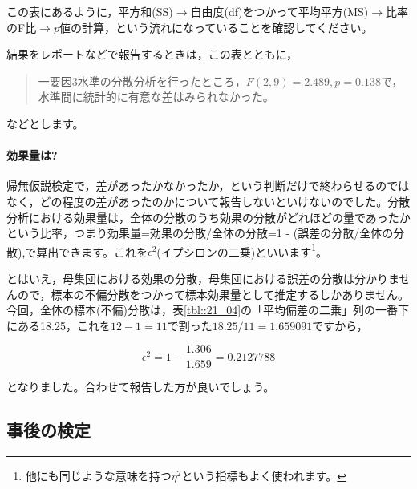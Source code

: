 \documentclass{ltjbook}
\begin{document}
この表にあるように，平方和(SS)$\to$自由度(df)をつかって平均平方(MS)$\to$比率のF比$\to$$p$値の計算，という流れになっていることを確認してください。

結果をレポートなどで報告するときは，この表とともに，
\begin{quote}
    一要因3水準の分散分析を行ったところ，$F(2,9)=2.489,p=0.138$で，水準間に統計的に有意な差はみられなかった。
\end{quote}
などとします。

\paragraph{効果量は?}
帰無仮説検定で，差があったかなかったか，という判断だけで終わらせるのではなく，どの程度の差があったのかについて報告しないといけないのでした。分散分析における効果量は，全体の分散のうち効果の分散がどれほどの量であったかという比率，つまり効果量=効果の分散/全体の分散=1 - (誤差の分散/全体の分散),で算出できます。これを$\epsilon^2$(イプシロンの二乗)といいます\footnote{他にも同じような意味を持つ$\eta^2$という指標もよく使われます。}。

とはいえ，母集団における効果の分散，母集団における誤差の分散は分かりませんので，標本の不偏分散をつかって標本効果量として推定するしかありません。今回，全体の標本(不偏)分散は，表\ref{tbl::21_04}の「平均偏差の二乗」列の一番下にある18.25，これを$12-1=11$で割った$18.25/11=1.659091$ですから，

\[\epsilon^2 = 1 - \frac{1.306}{1.659} = 0.2127788 \]

となりました。合わせて報告した方が良いでしょう。

\subsection{事後の検定}
\end{document}
